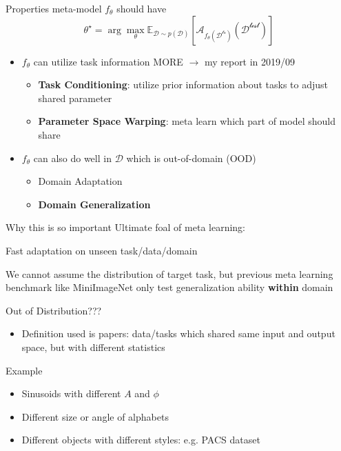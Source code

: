 \documentclass{beamer}
\begin{document}
\begin{frame}[t]{Properties meta-model $f_\theta$ should have}
      \begin{equation*}
        \theta^{\star} = \arg \max_\theta \mathbb{E}_{\mathcal{D} \sim p(\mathcal{D}) }[\mathcal{A}_{f_\theta(\mathcal{D^{\text{tr}}})}(\mathcal{D^{\text{test}}})]
      \end{equation*}

      \begin{itemize}
        \item $f_\theta$ can utilize task information MORE $\rightarrow$ my report in 2019/09
          \begin{itemize}
            \item \textbf{Task Conditioning}: utilize prior information about tasks to adjust shared parameter
            \item \textbf{Parameter Space Warping}: meta learn which part of model should share
          \end{itemize}

        \item $f_\theta$ can also do well in $\mathcal{D}$ which is out-of-domain (OOD)
          \begin{itemize}
            \item Domain Adaptation
            \item \textbf{Domain Generalization}
          \end{itemize}
      \end{itemize}
\end{frame}

\begin{frame}[t]{Why this is so important}
  Ultimate foal of meta learning:


	\begin{center}
    \LARGE{Fast adaptation on unseen task/data/domain}
	\end{center}


  \vspace{2em}
  We cannot assume the distribution of target task, but previous meta learning benchmark like MiniImageNet only test generalization ability \textbf{within} domain
\end{frame}

\begin{frame}[t]{Out of Distribution???}
  \begin{itemize}
    \item Definition used is papers: data/tasks which shared same input and output space, but with different statistics
  \end{itemize}

  \vspace{2em}

  Example
  \begin{itemize}
    \item Sinusoids with different $A$ and $\phi$
    \item Different size or angle of alphabets
    \item Different objects with different styles: e.g. PACS dataset
  \end{itemize}
\end{frame}
\end{document}
